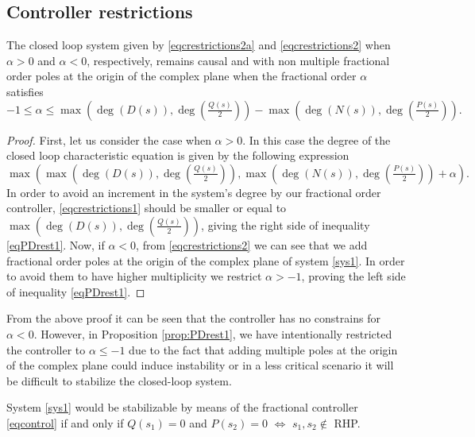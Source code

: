 \documentclass[twoside,reqno,11pt]{fcaa-var} %
\begin{document}
\subsection{Controller restrictions}
\begin{proposition}\label{prop:PDrest1}
The closed loop system given by \eqref{eqcrestrictions2a} and \eqref{eqcrestrictions2} when $\alpha>0$ and $\alpha<0$, respectively, remains causal and with non multiple fractional order poles at the origin of the complex plane when the fractional order $\alpha$ satisfies
\begin{equation}-1\leq\alpha\leq
\max\left(\deg\left(D(s)\right),\deg\left(\tfrac{Q(s)}{2}\right)\right)-\max\left(\deg\left(N(s)\right),\deg\left(\tfrac{P(s)}{2}\right)\right). \label{eqPDrest1}
\end{equation}
\end{proposition}
\begin{proof}
	First, let us consider the case when $\alpha>0$. In this case the degree of the closed loop characteristic equation is given by the following expression
	\begin{equation}
	\max\left(\max\left(\deg\left(D(s)\right),\deg\left(\tfrac{Q(s)}{2}\right)\right),\max\left(\deg\left(N(s)\right),\deg\left(\tfrac{P(s)}{2}\right)\right)+\alpha\right). \label{eqcrestrictions1}
	\end{equation}
	In order to avoid an increment in the system's degree by our fractional order controller, \eqref{eqcrestrictions1} should be smaller or equal to $\max\left(\deg\left(D(s)\right),\deg\left(\tfrac{Q(s)}{2}\right)\right)$, giving the right side of inequality \eqref{eqPDrest1}. Now, if $\alpha<0$,
	from \eqref{eqcrestrictions2} we can see that we add fractional order poles at the origin of the complex plane of system \eqref{sys1}. In order to avoid them to have higher multiplicity we restrict $\alpha>-1$, proving the left side of inequality \eqref{eqPDrest1}. 
\end{proof}
\begin{remark}
From the above proof it can be seen that the controller has no constrains for $\alpha<0$. However, in Proposition \ref{prop:PDrest1}, we have intentionally restricted the controller to $\alpha\leq -1$ due to the fact that adding multiple poles at the origin of the complex plane could induce instability or in a less critical scenario it will be difficult to stabilize the closed-loop system.
\end{remark}
\begin{proposition}\label{prop:PDrest2}
	System \eqref{sys1} would be stabilizable by means of the fractional controller \eqref{eqcontrol} if and only if $Q(s_1)=0$ and $P(s_2)=0$ $\iff$ $s_1,s_2\notin$ RHP.
\end{proposition}
\end{document}
